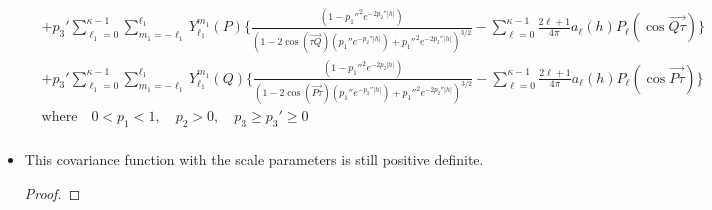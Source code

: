 \documentclass[11pt]{article}
\begin{document}
\begin{itemize}
\begin{align*}
&+ p_3' \sum_{\ell_1=0}^{\kappa-1} \sum_{m_1=-\ell_1}^{\ell_1} Y_{\ell_1}^{m_1}(P) \biggl\{ \frac{(1 - {p_1''}^2 e^{-2 p_2'' \lvert h \lvert})}{(1-2 \cos{(\overrightarrow{\tau Q})} (p_1'' e^{-p_2'' \lvert h \lvert}) + {p_1''}^2 e^{-2p_2'' \lvert h \lvert})^{3/2}} - \sum_{\ell=0}^{\kappa-1} \frac{2\ell+1}{4\pi} a_{\ell}(h)  P_\ell(\cos{\overrightarrow{Q\tau}}) \biggl\}\\
& + p_3' \sum_{\ell_1=0}^{\kappa-1} \sum_{m_1=-\ell_1}^{\ell_1} Y_{\ell_1}^{m_1}(Q) \biggl\{\frac{(1 - {p_1''}^2 e^{-2 p_2 \lvert h \lvert})}{(1-2 \cos{(\overrightarrow{P \tau})} (p_1'' e^{-p_2'' \lvert h \lvert}) + {p_1''}^2 e^{-2p_2'' \lvert h \lvert})^{3/2}} - \sum_{\ell=0}^{\kappa-1} \frac{2\ell+1}{4\pi} a_{\ell}(h)  P_\ell(\cos{\overrightarrow{P\tau}}) \biggl\}\\
&\text{where} \quad  0<p_1<1, \quad p_2>0, \quad p_3 \ge p_3' \ge 0 \\
\end{align*}

\item This covariance function with the scale parameters is still positive definite.\\
\begin{proof}


\end{proof}
\end{itemize}
\end{document}
